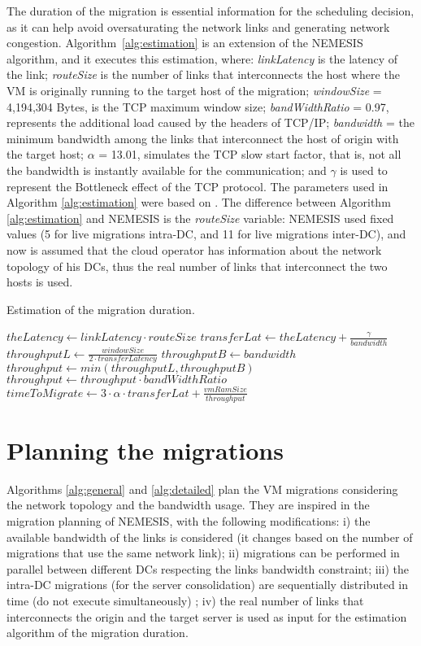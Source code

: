 The duration of the migration is essential information for the scheduling decision, as it can help avoid oversaturating the network links and generating network congestion. Algorithm~\ref{alg:estimation} is an extension of the NEMESIS algorithm, and it executes this estimation, where: \textit{linkLatency} is the latency of the link; \textit{routeSize} is the number of links that interconnects the host where the VM is originally running to the target host of the migration; \mbox{\textit{windowSize}} = 4,194,304 Bytes, is the TCP maximum window size; \textit{bandWidthRatio} = 0.97, represents the additional load caused by the headers of TCP/IP; \textit{bandwidth} = the minimum bandwidth among the links that interconnect the host of origin with the target host; $\alpha$ = 13.01, simulates the TCP slow start factor, that is, not all the bandwidth is instantly available for the communication; and $\gamma$ is used to represent the Bottleneck effect of the TCP protocol. The parameters used in Algorithm \ref{alg:estimation} were based on \cite{velho2013simgridparameters}. The difference between Algorithm \ref{alg:estimation}  and NEMESIS is the \textit{routeSize} variable: NEMESIS used fixed values (5 for live migrations intra-DC, and 11 for live migrations inter-DC), and now is assumed that the cloud operator has information about the network topology of his DCs, thus the real number of links that interconnect the two hosts is used.

\begin{algorithm}
\begin{algorithmic}
\caption{Estimation of the migration duration.}\label{alg:estimation}
\State $theLatency \gets linkLatency \cdot routeSize$
\State $transferLat \gets theLatency + \frac{\gamma}{bandwidth}$
\State $throughputL \gets \frac{windowSize}{2 \cdot transferLatency}$
\State $throughputB \gets bandwidth$
\State $throughput \gets min(throughputL, throughputB)$
\State $throughput \gets throughput 
\cdot bandWidthRatio$
\State $timeToMigrate \gets  3 \cdot \alpha \cdot transferLat + \frac{vmRamSize}{throughput}$ 
\end{algorithmic}
\end{algorithm}

\section{Planning the migrations}
\label{sec:modeling_smargreens}

Algorithms \ref{alg:general} and \ref{alg:detailed} plan the VM migrations considering the network topology and the bandwidth usage. They are inspired in the migration planning of NEMESIS, with the following modifications: i) the available bandwidth of the links is considered (it changes based on the number of migrations that use the same network link); ii) migrations can be performed in parallel between different DCs respecting the links bandwidth constraint; iii) the intra-DC migrations (for the server consolidation) are sequentially distributed in time (do not execute simultaneously) ; iv) the real number of links that interconnects the origin and the target server is used as input for the estimation algorithm of the migration duration. 

